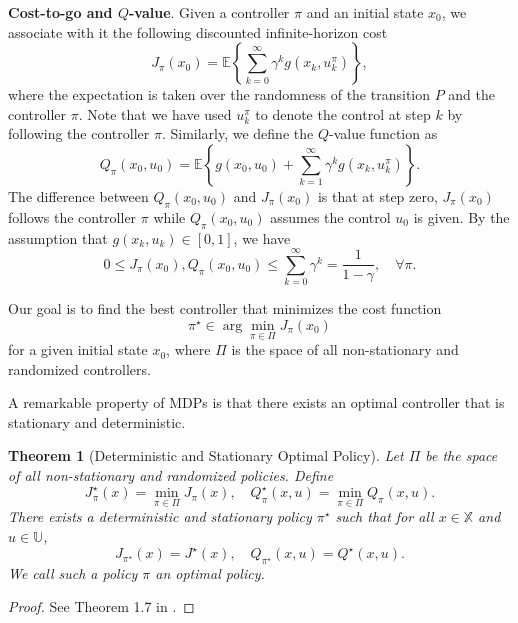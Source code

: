 \documentclass[
]{book}
\newtheorem{theorem}{Theorem}[chapter]
\theoremstyle{definition}
\theoremstyle{definition}
\theoremstyle{definition}
\theoremstyle{definition}
\theoremstyle{remark}
\begin{document}
\textbf{Cost-to-go and \(Q\)-value}. Given a controller \(\pi\) and an initial state \(x_0\), we associate with it the following discounted infinite-horizon cost
\begin{equation}
J_\pi(x_0) = \mathbb{E} \left\{ \sum_{k=0}^{\infty} \gamma^k g(x_k, u_k^{\pi}) \right\},
\label{eq:mdp-cost-policy}
\end{equation}
where the expectation is taken over the randomness of the transition \(P\) and the controller \(\pi\). Note that we have used \(u^{\pi}_k\) to denote the control at step \(k\) by following the controller \(\pi\). Similarly, we define the \(Q\)-value function as
\begin{equation}
Q_\pi(x_0,u_0) = \mathbb{E} \left\{  g(x_0,u_0) + \sum_{k=1}^{\infty} \gamma^k g(x_k,u_k^{\pi}) \right\}.
\label{eq:mdp-Q-value}
\end{equation}
The difference between \(Q_\pi(x_0,u_0)\) and \(J_\pi(x_0)\) is that at step zero, \(J_\pi(x_0)\) follows the controller \(\pi\) while \(Q_\pi(x_0,u_0)\) assumes the control \(u_0\) is given. By the assumption that \(g(x_k,u_k) \in [0,1]\), we have
\[
0 \leq J_\pi(x_0), Q_\pi(x_0,u_0) \leq \sum_{k=0}^{\infty} \gamma^k = \frac{1}{1-\gamma}, \quad \forall \pi.
\]

Our goal is to find the best controller that minimizes the cost function
\begin{equation}
\pi^\star \in \arg\min_{\pi \in \Pi} J_\pi(x_0)
\label{eq:mdp-objective}
\end{equation}
for a given initial state \(x_0\), where \(\Pi\) is the space of all non-stationary and randomized controllers.

A remarkable property of MDPs is that there exists an optimal controller that is stationary and deterministic.

\begin{theorem}[Deterministic and Stationary Optimal Policy]
\protect\hypertarget{thm:optimalmdppolicystationary}{}\label{thm:optimalmdppolicystationary}Let \(\Pi\) be the space of all non-stationary and randomized policies. Define
\[
J^\star_\pi(x) = \min_{\pi \in \Pi} J_\pi(x), \quad Q^\star_\pi(x,u) = \min_{\pi \in \Pi } Q_\pi(x,u).
\]
There exists a deterministic and stationary policy \(\pi^\star\) such that for all \(x \in \mathbb{X}\) and \(u \in \mathbb{U}\),
\[
J_{\pi^\star}(x) = J^\star(x), \quad Q_{\pi^\star}(x,u) = Q^\star(x,u).
\]
We call such a policy \(\pi\) an optimal policy.
\end{theorem}

\begin{proof}
See Theorem 1.7 in \citep{agarwal22book-reinforcement}.
\end{proof}
\end{document}
